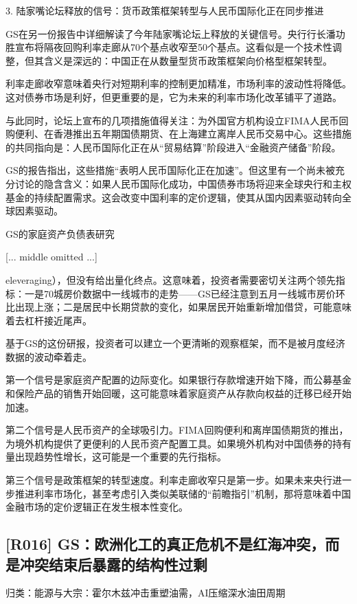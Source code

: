 \documentclass[11pt]{ctexart}
\begin{document}
3. 陆家嘴论坛释放的信号：货币政策框架转型与人民币国际化正在同步推进

GS在另一份报告中详细解读了今年陆家嘴论坛上释放的关键信号。央行行长潘功胜宣布将隔夜回购利率走廊从70个基点收窄至50个基点。这看似是一个技术性调整，但其含义是深远的：中国正在从数量型货币政策框架向价格型框架转型。

利率走廊收窄意味着央行对短期利率的控制更加精准，市场利率的波动性将降低。这对债券市场是利好，但更重要的是，它为未来的利率市场化改革铺平了道路。

与此同时，论坛上宣布的几项措施值得关注：为外国官方机构设立FIMA人民币回购便利、在香港推出五年期国债期货、在上海建立离岸人民币交易中心。这些措施的共同指向是：人民币国际化正在从“贸易结算”阶段进入“金融资产储备”阶段。

GS的报告指出，这些措施“表明人民币国际化正在加速”。但这里有一个尚未被充分讨论的隐含含义：如果人民币国际化成功，中国债券市场将迎来全球央行和主权基金的持续配置需求。这会改变中国利率的定价逻辑，使其从国内因素驱动转向全球因素驱动。

GS的家庭资产负债表研究

[... middle omitted ...]

eleveraging），但没有给出量化终点。这意味着，投资者需要密切关注两个领先指标：一是70城房价数据中一线城市的走势——GS已经注意到五月一线城市房价环比出现上涨；二是居民中长期贷款的变化，如果居民开始重新增加借贷，可能意味着去杠杆接近尾声。

基于GS的这份研报，投资者可以建立一个更清晰的观察框架，而不是被月度经济数据的波动牵着走。

第一个信号是家庭资产配置的边际变化。如果银行存款增速开始下降，而公募基金和保险产品的销售开始回暖，这可能意味着家庭资产从存款向权益的迁移已经开始加速。

第二个信号是人民币资产的全球吸引力。FIMA回购便利和离岸国债期货的推出，为境外机构提供了更便利的人民币资产配置工具。如果境外机构对中国债券的持有量出现趋势性增长，这可能是一个重要的先行指标。

第三个信号是政策框架的转型速度。利率走廊收窄只是第一步。如果未来央行进一步推进利率市场化，甚至考虑引入类似美联储的“前瞻指引”机制，那将意味着中国金融市场的定价逻辑正在发生根本性变化。

\subsection{[R016] GS：欧洲化工的真正危机不是红海冲突，而是冲突结束后暴露的结构性过剩}
{\small\color{refgray}归类：能源与大宗：霍尔木兹冲击重塑油需，AI压缩深水油田周期}
\end{document}
